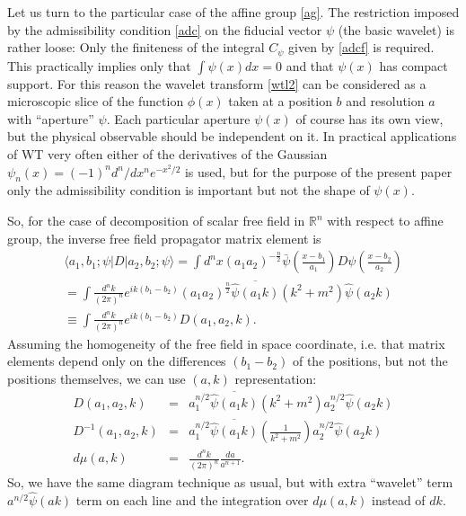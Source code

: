 \documentclass[a4paper,a4paper]{article}
\def\bra{\langle}
\def\ket{\rangle}
\newcommand{\R}{\mathbb{R}}
\def\bra{\langle}
\def\ket{\rangle}
\def\dk#1#2{\frac{ d^{#2}{#1} }{ (2\pi)^{#2} }} %
\def\da#1#2{\frac{ d{#1}}{{#1}^{{#2}+1}}}
\begin{document}
Let us turn to the particular case of the affine group \eqref{ag}. 
The restriction imposed by the admissibility condition \eqref{adc} on 
the fiducial vector $\psi$ (the basic wavelet) is rather loose: 
Only the finiteness of the integral $C_\psi$ given by \eqref{adcf} is 
required.  
This practically implies only that $\int \psi(x)dx =0$ and that 
$\psi(x)$ has compact support. For this reason the wavelet transform 
\eqref{wtl2}
can be considered as a microscopic slice of the function $\phi(x)$ taken 
at a position $b$ and resolution $a$ with ``aperture'' $\psi$. Each 
particular aperture $\psi(x)$ of course has its own view, but the physical 
observable should be independent on it. In practical applications of 
WT very often either of the derivatives of the Gaussian 
$\psi_n(x) = (-1)^n d^n/dx^n e^{-x^2/2}$ is used, but for the purpose of 
the present paper only the admissibility condition is important but not 
the shape of $\psi(x)$. 

So, for the case of decomposition of scalar free field in $\R^n$ 
with respect to affine group, the inverse free field propagator matrix 
element is 
\begin{eqnarray*}
\bra a_1,b_1;\psi | D | a_2, b_2; \psi\ket = \int d^nx (a_1a_2)^{-\frac{n}{2}}
\bar\psi \left( \frac{x-b_1}{a_1} \right)  D \psi\left(\frac{x-b_2}{a_2}\right) \\
= \int \dk{k}{n} e^{ik(b_1-b_2)} (a_1a_2)^{\frac{n}{2}} \overline{\hat \psi(a_1 k)}
(k^2+m^2) \hat \psi(a_2 k) \\
\equiv \int \dk{k}{n} e^{ik(b_1-b_2)} D(a_1,a_2,k).
\end{eqnarray*} 
Assuming the homogeneity of the free field in space coordinate, i.e. that 
matrix elements depend only on the differences $(b_1-b_2)$ of the positions, 
but not the positions themselves, we can use  $(a,k)$ representation:
\begin{eqnarray}
\nonumber D(a_1,a_2,k) &=& a_1^{n/2} \overline {\hat \psi(a_1 k)} (k^2+m^2)
                 a_2^{n/2}\hat \psi(a_2 k) \\
D^{-1}(a_1,a_2,k) &=& a_1^{n/2} \overline {\hat \psi(a_1 k)} 
                  \left( \frac{1}{k^2+m^2} \right)
                 a_2^{n/2}\hat \psi(a_2 k)\\
\nonumber d\mu(a,k)       &=& \dk{k}{n}\da{a}{n}.
\end{eqnarray}
So, we have the same diagram technique as usual, but with extra 
``wavelet'' term $a^{n/2}\hat \psi(a k)$ term on each line and the integration 
over $d\mu(a,k)$ instead of $dk$. 
\end{document}
